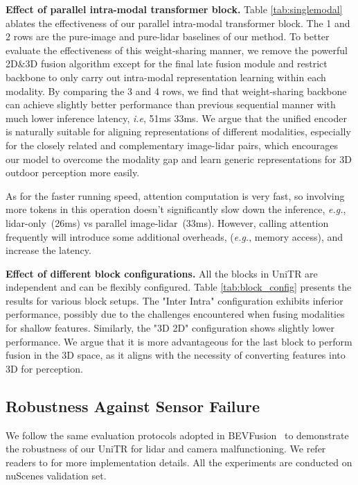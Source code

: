 \documentclass[10pt,twocolumn,letterpaper]{article}
\begin{document}
\noindent \textbf{Effect of parallel intra-modal transformer block.} Table \ref{tab:singlemodal} ablates the effectiveness of our parallel intra-modal transformer block. The 1 and 2 rows are the pure-image and pure-lidar baselines of our method. To better evaluate the effectiveness of this weight-sharing manner, we remove the powerful 2D\&3D fusion algorithm except for the final late fusion module and restrict backbone to only carry out intra-modal representation learning within each modality. By comparing the 3 and 4 rows, we find that weight-sharing backbone can achieve slightly better performance than previous sequential manner with much lower inference latency, \emph{i.e}, 51ms  33ms.  We argue that the unified encoder is naturally suitable for aligning representations of different modalities, especially for the closely related and complementary image-lidar pairs, which encourages our model to overcome the modality gap and learn generic representations for 3D outdoor perception more easily. 

As for the faster running speed, attention computation is very fast, so involving more tokens in this operation doesn't significantly slow down the inference, \emph{e.g.}, lidar-only~(26ms) vs parallel image-lidar~(33ms). However, calling attention frequently will introduce some additional overheads, (\textit{e.g.}, memory access), and increase the latency. 


\noindent \textbf{Effect of different block configurations.} All the blocks in UniTR are independent and can be flexibly configured. Table \ref{tab:block_config} presents the results for various block setups. The "Inter  Intra" configuration exhibits inferior performance, possibly due to the challenges encountered when fusing modalities for shallow features. Similarly, the "3D  2D" configuration shows slightly lower performance.  We argue that it is more advantageous for the last block to perform fusion in the 3D space, as it aligns with the necessity of converting features into 3D for perception.
\subsection{Robustness Against Sensor Failure}
We follow the same evaluation protocols adopted in BEVFusion~\cite{liang2022bevfusion} to demonstrate the robustness of our UniTR for lidar and camera malfunctioning. We refer readers to \cite{yu2022benchmarking,liang2022bevfusion} for more implementation details. All the experiments are conducted on nuScenes validation set. 
\end{document}
